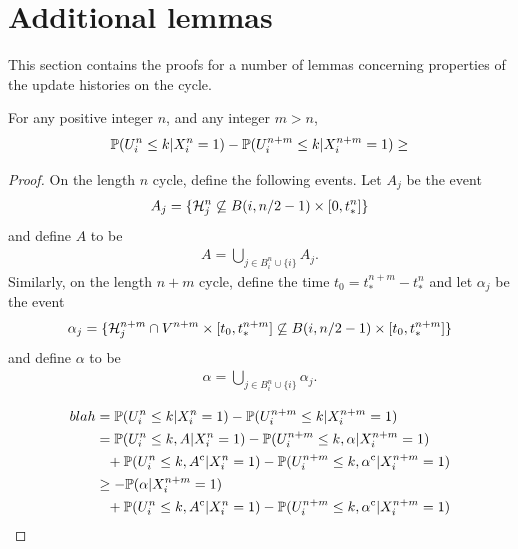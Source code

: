 	\section{Additional lemmas}
	\label{sec:additional lemmas 1D}
	This section contains the proofs for a number of lemmas concerning properties of the update histories on the cycle.

	\begin{lemma}
	\label{lem: U converges}
	For any positive integer $n$, and any integer $m > n$,
		\begin{equation}
			\mathbb{P}(U_i^n \leq k | X_i^n = 1) - \mathbb{P}(U_i^{n+m} \leq k | X_i^{n+m} = 1) \geq 
		\end{equation}
	\end{lemma}
	\begin{proof}
		On the length $n$ cycle, define the following events. Let $A_j$ be the event
		\begin{align}
			A_j = \{\mathcal{H}_j^n \not \subseteq B(i, n/2 - 1) \times [0, t_*^n]\}
		\end{align}
		and define $A$ to be
		\begin{align}
			A = \bigcup_{j \in B_i^n \cup \{i\}} A_j.
		\end{align}
		Similarly, on the length $n+m$ cycle, define the time $t_0 = t_*^{n+m} - t_*^n$ and let $\alpha_j$ be the event
		\begin{align}
			\alpha_j = \{\mathcal{H}_j^{n+m} \cap V^{n+m} \times [t_0, t_*^{n+m}] \not \subseteq B(i, n/2 - 1) \times [t_0, t_*^{n+m}]\}
		\end{align}
		and define $\alpha$ to be
		\begin{align}
			\alpha = \bigcup_{j \in B_i^n \cup \{i\}} \alpha_j.
		\end{align}

		\begin{align}
			blah &= \mathbb{P}(U_i^n \leq k | X_i^n = 1) - \mathbb{P}(U_i^{n+m} \leq k | X_i^{n+m} = 1) \\
			&= \mathbb{P}(U_i^n \leq k, A | X_i^n = 1) - \mathbb{P}(U_i^{n+m} \leq k, \alpha | X_i^{n+m} = 1) \notag \\
			&\phantom{=} + \mathbb{P}(U_i^n \leq k, A^\mathrm{c} | X_i^n = 1) - \mathbb{P}(U_i^{n+m} \leq k, \alpha^\mathrm{c} | X_i^{n+m} = 1) \\
			&\geq -\mathbb{P}(\alpha | X_i^{n+m} = 1) \notag \\
			&\phantom{=} + \mathbb{P}(U_i^n \leq k, A^\mathrm{c} | X_i^n = 1) - \mathbb{P}(U_i^{n+m} \leq k, \alpha^\mathrm{c} | X_i^{n+m} = 1)
		\end{align}


\end{proof}
